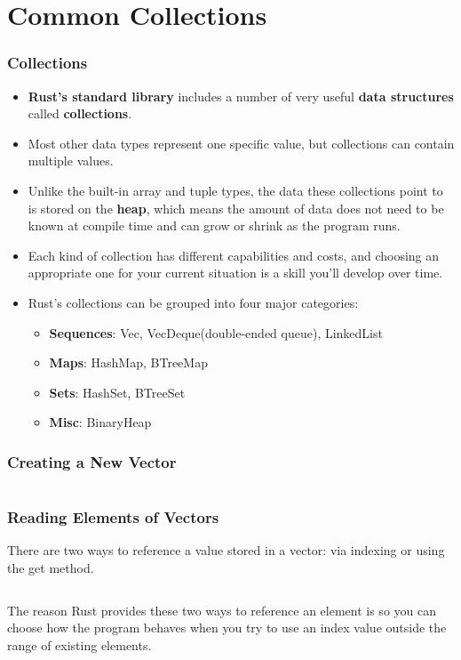 \documentclass{beamer}
\begin{document}
\section{Common Collections}
\begin{frame}[fragile]
	\frametitle{Collections}
	\begin{itemize}
		\item \textbf{Rust’s standard library} includes a number of very useful \textbf{data structures} called \textbf{collections}. 
		\item 	Most other data types represent one specific value, but collections can contain multiple values. 
		\item 	Unlike the built-in array and tuple types, the data these collections point to is stored on the \textbf{heap}, which means the amount of data does not need to be known at compile time and can grow or shrink as the program runs.
		\item 	Each kind of collection has different capabilities and costs, and choosing an appropriate one for your current situation is a skill you’ll develop over time. 
		\item Rust’s collections can be grouped into four major categories:
		\begin{itemize}
			\item 	\textbf{Sequences}: Vec, VecDeque(double-ended queue), LinkedList
			\item 	\textbf{Maps}: HashMap, BTreeMap
			\item 	\textbf{Sets}: HashSet, BTreeSet
			\item 	\textbf{Misc}: BinaryHeap
		\end{itemize}
	\end{itemize}
\end{frame}

\begin{frame}[fragile]
	\frametitle{Creating a New Vector}
	\inputminted{rust}{./code/vector.rs}
\end{frame}

\begin{frame}[fragile]
	\frametitle{Reading Elements of Vectors}
	There are two ways to reference a value stored in a vector: via indexing or using the get method. 
	
	\inputminted[fontsize=\scriptsize]{rust}{./code/vector2.rs}
	
	The reason Rust provides these two ways to reference an element is so you can choose how the program behaves when you try to use an index value outside the range of existing elements.
\end{frame}
\end{document}
